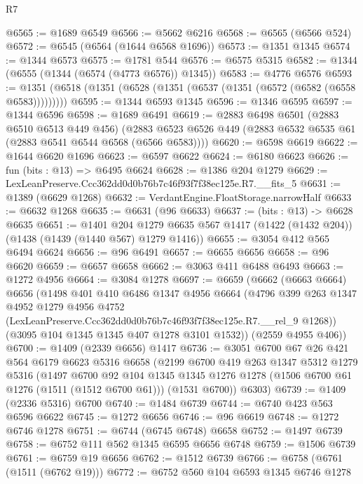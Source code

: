 \begin{lexlean}{R7}
\begin{coremodule}
@6565 := @1689 @6549
@6566 := @5662 @6216
@6568 := @6565 (@6566 @524)
@6572 := @6545 (@6564 (@1644 @6568 @1696))
@6573 := @1351 @1345
@6574 := @1344 @6573
@6575 := @1781 @544
@6576 := @6575 @5315
@6582 := @1344 (@6555 (@1344 (@6574 (@4773 @6576)) @1345))
@6583 := @4776 @6576
@6593 := @1351 (@6518 (@1351 (@6528 (@1351 (@6537 (@1351 (@6572 (@6582 (@6558 @6583)))))))))
@6595 := @1344 @6593 @1345
@6596 := @1346 @6595
@6597 := @1344 @6596
@6598 := @1689 @6491
@6619 := @2883
    @6498
    @6501
    (@2883 @6510 @6513 @449 @456)
    (@2883 @6523 @6526 @449 (@2883 @6532 @6535 @61 (@2883 @6541 @6544 @6568 (@6566 @6583))))
@6620 := @6598 @6619
@6622 := @1644 @6620 @1696
@6623 := @6597 @6622
@6624 := @6180 @6623
@6626 := fun (bits : @13) => @6495 @6624
@6628 := @1386 @204 @1279
@6629 := LexLeanPreserve.Ccc362dd0d0b76b7c46f93f7f38ec125e.R7.__fits_5
@6631 := @1389 (@6629 @1268)
@6632 := VerdantEngine.FloatStorage.narrowHalf
@6633 := @6632 @1268
@6635 := @6631 (@96 @6633)
@6637 := (bits : @13) -> @6628 @6635
@6651 := @1401
    @204
    @1279
    @6635
    @567
    @1417
    (@1422 (@1432 @204))
    (@1438 (@1439 (@1440 @567) @1279 @1416))
@6655 := @3054 @412 @565 @6494 @6624
@6656 := @96 @6491
@6657 := @6655 @6656
@6658 := @96 @6620
@6659 := @6657 @6658
@6662 := @3063 @411 @6488 @6493
@6663 := @1272 @4956
@6664 := @3084 @1278
@6697 := @6659
    (@6662
      (@6663 @6664)
      @6656
      (@1498
        @401
        @410
        @6486
        @1347
        @4956
        @6664
        (@4796
          @399
          @263
          @1347
          @4952
          @1279
          @4956
          @4752
          (LexLeanPreserve.Ccc362dd0d0b76b7c46f93f7f38ec125e.R7.__rel_9 @1268))
        (@3095 @104 @1345 @1345 @407 @1278 @3101 @1532))
      (@2559 @4955 @406))
@6700 := @1409 (@2339 @6656) @1417
@6736 := @3051
    @6700
    @67
    @26
    @421
    @564
    @6179
    @6623
    @5316
    @6658
    (@2199
      @6700
      @419
      @263
      @1347
      @5312
      @1279
      @5316
      (@1497
        @6700
        @92
        @104
        @1345
        @1345
        @1276
        @1278
        (@1506 @6700 @61 @1276 (@1511 (@1512 @6700 @61)))
        (@1531 @6700))
      @6303)
@6739 := @1409 (@2336 @5316) @6700
@6740 := @1484 @6739
@6744 := @6740 @423 @563 @6596 @6622
@6745 := @1272 @6656
@6746 := @96 @6619
@6748 := @1272 @6746 @1278
@6751 := @6744 (@6745 @6748) @6658
@6752 := @1497 @6739
@6758 := @6752 @111 @562 @1345 @6595 @6656 @6748
@6759 := @1506 @6739
@6761 := @6759 @19 @6656
@6762 := @1512 @6739
@6766 := @6758 (@6761 (@1511 (@6762 @19)))
@6772 := @6752 @560 @104 @6593 @1345 @6746 @1278

\end{coremodule}
\end{lexlean}
